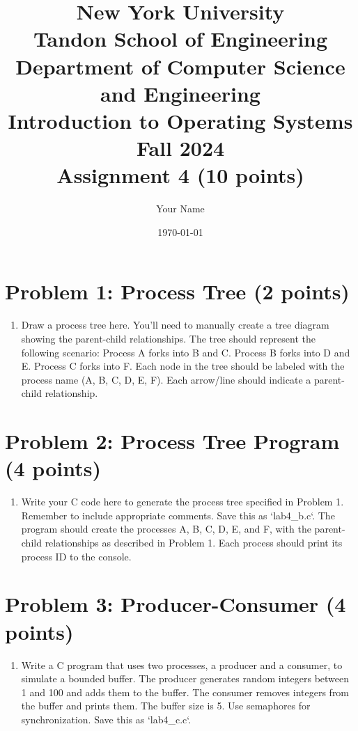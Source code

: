\documentclass{article}
\title{New York University \\ Tandon School of Engineering \\ Department of Computer Science and Engineering \\ Introduction to Operating Systems \\ Fall 2024 \\ Assignment 4 (10 points)}
\author{Your Name}
\date{\today}
\begin{document}
\maketitle

\section{Problem 1: Process Tree (2 points)}

\begin{enumerate}
    \item Draw a process tree here.  You'll need to manually create a tree diagram showing the parent-child relationships.  The tree should represent the following scenario: Process A forks into B and C. Process B forks into D and E. Process C forks into F. Each node in the tree should be labeled with the process name (A, B, C, D, E, F). Each arrow/line should indicate a parent-child relationship.
\end{enumerate}


\section{Problem 2: Process Tree Program (4 points)}

\begin{enumerate}
    \item Write your C code here to generate the process tree specified in Problem 1.  Remember to include appropriate comments.  Save this as `lab4_b.c`.  The program should create the processes A, B, C, D, E, and F, with the parent-child relationships as described in Problem 1. Each process should print its process ID to the console.
\end{enumerate}

\section{Problem 3:  Producer-Consumer (4 points)}

\begin{enumerate}
    \item Write a C program that uses two processes, a producer and a consumer, to simulate a bounded buffer. The producer generates random integers between 1 and 100 and adds them to the buffer.  The consumer removes integers from the buffer and prints them. The buffer size is 5. Use semaphores for synchronization.  Save this as `lab4_c.c`.
\end{enumerate}
\end{document}

